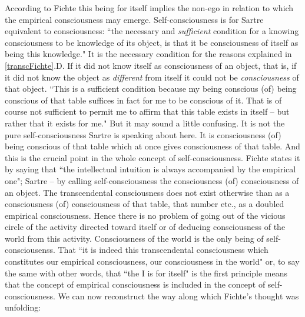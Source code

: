 According to Fichte this being for itself implies the non-ego in relation to which the empirical consciousness 
may emerge. Self-consciousness is for Sartre equivalent to consciousness: ``the necessary and {\em sufficient} condition 
for a knowing consciousness to be knowledge of its object, is that it be consciousness of itself as being this 
knowledge." \cite{BN}   
It is the necessary condition for the reasons explained in \ref{transcFichte}.D.
 If it did not know itself as
consciousness of an object, that is, if it did not know the object as {\em different} from 
itself it could not be 
{\em consciousness} of that object. ``This is a sufficient condition because my being conscious (of) being conscious of 
that table suffices in fact for me to be conscious of it. That is of course not sufficient to permit me to affirm that 
this table exists in itself -- but rather that it exists for me." \cite{BN}   
But it may sound a little confusing. It is not the pure 
self-consciousness Sartre is speaking about here. It is consciousness (of) being conscious of that table which at 
once gives consciousness of that table. And this is the crucial point in the whole concept of self-consciousness. 
Fichte states it by saying that ``the intellectual intuition is always accompanied by the empirical one"; Sartre -- by 
calling self-consciousness the consciousness (of) consciousness of an object. The transcendental consciousness 
does not exist otherwise than as a consciousness (of) consciousness of that table, that number etc., as a doubled 
empirical consciousness. Hence there is no problem of going out of the vicious circle of the activity directed 
toward itself or of deducing consciousness of the world from this activity. Consciousness of the world is the only 
being of self-consciousenss. That ``it is indeed this transcendental consciousness which constitutes our empirical 
consciousness, our consciousness in the world" \cite{ToE} or, to say the same with other words, that ``the I is for itself" is 
the first principle means that the concept of empirical consciousness is included in the concept of self-consciousness. We can now reconstruct the way along which Fichte's thought was unfolding:

